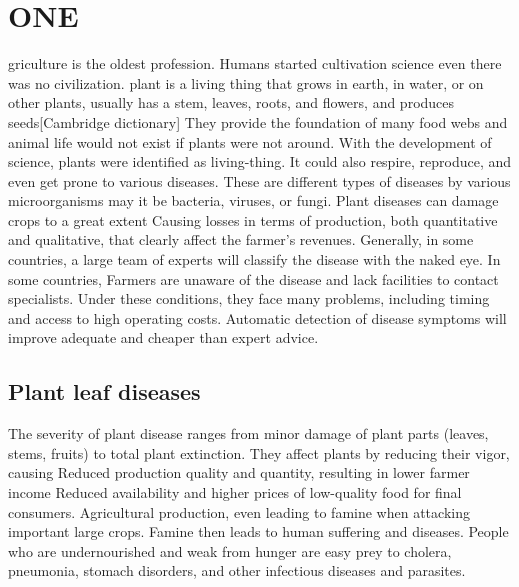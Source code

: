 %
%
\let\textcircled=\pgftextcircled
\chapter{ONE}
\label{chap:intro}

griculture is the oldest profession. Humans started cultivation science even there was no civilization.
plant is a living thing that grows in earth, in water, or on other plants, usually has a stem, leaves, roots, and flowers, and produces seeds[Cambridge dictionary]
They provide the foundation of many food webs and animal life would not exist if plants were not around. 
With the development of science, plants were identified as living-thing. It could also respire, reproduce, and even get prone to various diseases. These are different types of diseases by various microorganisms may it be bacteria, viruses, or fungi. Plant diseases can damage crops to a great extent Causing losses in terms of production, both quantitative and qualitative, that clearly affect the farmer's revenues.
Generally, in some countries, a large team of experts will classify the disease with the naked eye. In some countries, Farmers are unaware of the disease and lack facilities to contact specialists. Under these conditions, they face many problems, including timing and access to high operating costs. Automatic detection of disease symptoms will improve adequate and cheaper than expert advice.

\section{Plant leaf diseases}
\label{sec:sec01}

The severity of plant disease ranges from minor damage of plant parts (leaves, stems, fruits) to total plant extinction. They affect plants by reducing their vigor, causing Reduced production quality and quantity, resulting in lower farmer income Reduced availability and higher prices of low-quality food for final consumers.
 Agricultural production, even leading to famine when attacking important large crops. Famine then leads to human suffering and diseases. People who are undernourished and weak from hunger are easy prey to cholera, pneumonia, stomach disorders, and other infectious diseases and parasites.\cite{book1} \\
 
